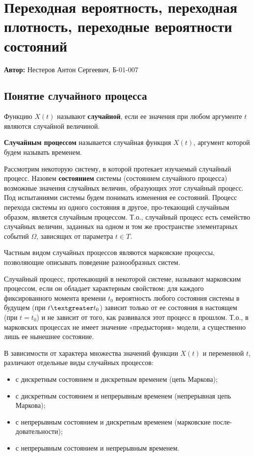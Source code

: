

	\section{Переходная вероятность, переходная плотность, переходные вероятности состояний}
	
	\textbf{Автор:} Нестеров Антон Сергеевич, Б-01-007
	
	\subsection{Понятие случайного процесса}
	Функцию $X(t)$ называют \textbf{случайной}, если ее значения при любом аргументе $t$ являются случайной величиной.
	
	\textbf{Случайным процессом} называется случайная функция $X(t)$, аргумент которой будем называть временем. 
	
	Рассмотрим некоторую систему, в которой протекает изучаемый случайный процесс. Назовем \textbf{состоянием} системы (состоянием случайного процесса) возможные значения случайных величин, образующих этот случайный процесс. Под испытаниями системы будем понимать изменения ее состояний. Процесс перехода системы из одного состояния в другое, про-текающий случайным образом, является случайным процессом. Т.о., случайный процесс есть семейство случайных величин, заданных на одном и том же пространстве элементарных событий $\Omega$, зависящих от параметра $t\in T$.
	
	Частным видом случайных процессов являются марковские процессы, позволяющие описывать поведение разнообразных систем. 
	
	Случайный процесс, протекающий в некоторой системе, называют марковским процессом, если он обладает характерным свойством: для каждого фиксированного момента времени $t_0$ вероятность любого состояния системы в будущем (при $t\textgreater t_0$) зависит только от ее состояния в настоящем (при $t = t_0$) и не зависит от того, как развивался этот процесс в прошлом. Т.о., в марковских процессах не имеет значение «предыстория» модели, а существенно лишь ее нынешнее состояние.
	
	В зависимости от характера множества значений функции $X(t)$ и переменной $t$, различают отдельные виды случайных процессов:
	\begin{itemize}
		\item с дискретным состоянием и дискретным временем (цепь Маркова);
		\item с дискретным состоянием и непрерывным временем (непрерывная цепь Маркова);
		\item с непрерывным состоянием и дискретным временем (марковские после-довательности);
		\item с непрерывным состоянием и непрерывным временем.
	\end{itemize}
	
